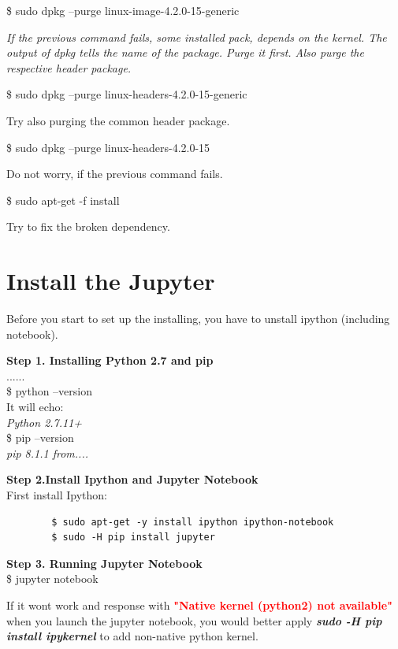 \documentclass[a4paper, 12pt]{article}
\begin{document}
    \$ sudo dpkg --purge linux-image-4.2.0-15-generic

    \emph{If the previous command fails, some installed pack, depends on the kernel. The output of dpkg tells the name of the package. Purge it first.
    Also purge the respective header package.}

    \$ sudo dpkg --purge linux-headers-4.2.0-15-generic

    Try also purging the common header package.

    \$ sudo dpkg --purge linux-headers-4.2.0-15

    Do not worry, if the previous command fails.

    \$ sudo apt-get -f install 

    Try to fix the broken dependency.

    \section{Install the Jupyter}
    Before you start to set up the installing, you have to unstall ipython (including notebook).

    \textbf{Step 1. Installing Python 2.7 and pip}\\
    ......\\
    \$ python --version\\
    It will echo:\\
    \textit{Python 2.7.11+}\\
    \$ pip --version\\
    \textit{pip 8.1.1 from....}

    \textbf{Step 2.Install Ipython and Jupyter Notebook}\\
    First install Ipython:\\
    \begin{verbatim}
        $ sudo apt-get -y install ipython ipython-notebook
        $ sudo -H pip install jupyter
    \end{verbatim}

    \textbf{Step 3. Running Jupyter Notebook}\\
    \$ jupyter notebook

    If it wont work and response with \textbf{\textcolor{red}{"Native kernel (python2) not available"}} when you launch the jupyter notebook,
    you would better apply  \textbf{\textit{sudo -H pip install ipykernel}} to add non-native python kernel.

\end{document}
